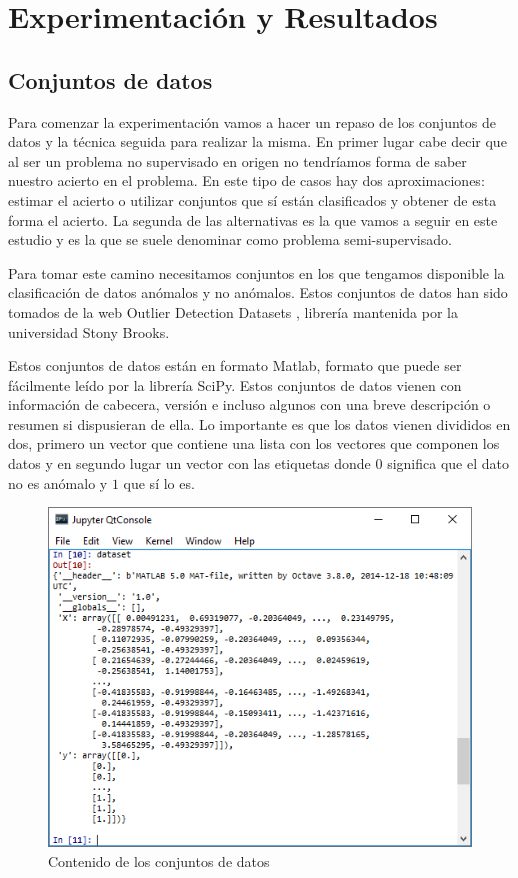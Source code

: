 \chapter{Experimentación y Resultados}
\label{chapter:experimentacion_resultados}

\section{Conjuntos de datos}

Para comenzar la experimentación vamos a hacer un repaso de los conjuntos de datos y la técnica seguida para realizar la misma. En primer lugar cabe decir que al ser un problema no supervisado en origen no tendríamos forma de saber nuestro acierto en el problema. En este tipo de casos hay dos aproximaciones: estimar el acierto o utilizar conjuntos que sí están clasificados y obtener de esta forma el acierto. La segunda de las alternativas es la que vamos a seguir en este estudio y es la que se suele denominar como problema semi-supervisado. 

Para tomar este camino necesitamos conjuntos en los que tengamos disponible la clasificación de datos anómalos y no anómalos. Estos conjuntos de datos han sido tomados de la web Outlier Detection Datasets \cite{shebuti_ryana_odds_2016}, librería mantenida por la universidad Stony Brooks.

Estos conjuntos de datos están en formato Matlab, formato que puede ser fácilmente leído por la librería SciPy. Estos conjuntos de datos vienen con información de cabecera, versión e incluso algunos con una breve descripción o resumen si dispusieran de ella. Lo importante es que los datos vienen divididos en dos, primero un vector que contiene una lista con los vectores que componen los datos y en segundo lugar un vector con las etiquetas donde $0$ significa que el dato no es anómalo y $1$ que sí lo es.

\begin{figure}[H]
	\centering
	\includegraphics[scale=0.8]{imagenes/datasets_matlab}
	\caption{Contenido de los conjuntos de datos}
	\label{dataset_matlab}
\end{figure}

